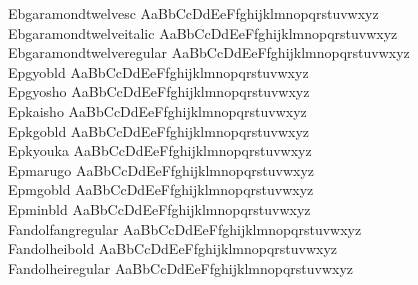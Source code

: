 \begin{tabbing}
Ebgaramondtwelvesc \> { AaBbCcDdEeFfghijklmnopqrstuvwxyz} \\
Ebgaramondtwelveitalic \> { AaBbCcDdEeFfghijklmnopqrstuvwxyz} \\
Ebgaramondtwelveregular \> { AaBbCcDdEeFfghijklmnopqrstuvwxyz} \\
Epgyobld \> { AaBbCcDdEeFfghijklmnopqrstuvwxyz} \\
Epgyosho \> { AaBbCcDdEeFfghijklmnopqrstuvwxyz} \\
Epkaisho \> { AaBbCcDdEeFfghijklmnopqrstuvwxyz} \\
Epkgobld \> { AaBbCcDdEeFfghijklmnopqrstuvwxyz} \\
Epkyouka \> { AaBbCcDdEeFfghijklmnopqrstuvwxyz} \\
Epmarugo \> { AaBbCcDdEeFfghijklmnopqrstuvwxyz} \\
Epmgobld \> { AaBbCcDdEeFfghijklmnopqrstuvwxyz} \\
Epminbld \> { AaBbCcDdEeFfghijklmnopqrstuvwxyz} \\
Fandolfangregular \> { AaBbCcDdEeFfghijklmnopqrstuvwxyz} \\
Fandolheibold \> { AaBbCcDdEeFfghijklmnopqrstuvwxyz} \\
Fandolheiregular \> { AaBbCcDdEeFfghijklmnopqrstuvwxyz} \\

\end{tabbing}

